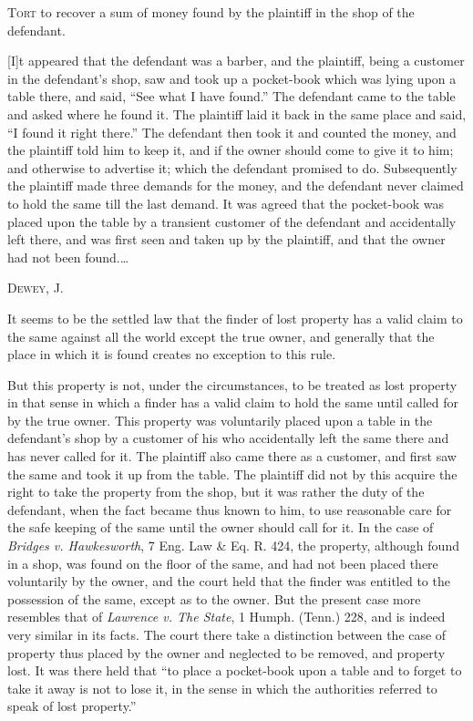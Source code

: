
\textsc{Tort} to recover a sum of money found by the plaintiff in the shop of
the
defendant.

[I]t appeared that the defendant was a barber, and the plaintiff, being a
customer in the defendant's shop, saw and took up a pocket-book which was lying
upon a table there, and said, ``See what I have found.'' The defendant came to
the table and asked where he found it. The plaintiff laid it back in the same
place and said, ``I found it right there.'' The defendant then took it and
counted the money, and the plaintiff told him to keep it, and if the owner
should come to give it to him; and otherwise to advertise it; which the
defendant promised to do. Subsequently the plaintiff made three demands for the
money, and the defendant never claimed to hold the same till the last demand.
It was agreed that the pocket-book was placed upon the table by a transient
customer of the defendant and accidentally left there, and was first seen and
taken up by the plaintiff, and that the owner had not been found.\ldots

\opinion \textsc{Dewey}, J.

It seems to be the settled law that the finder of lost property has a valid
claim to the same against all the world except the true owner, and generally
that the place in which it is found creates no exception to this rule.

But this property is not, under the circumstances, to be treated as lost
property in that sense in which a finder has a valid claim to hold the same
until called for by the true owner. This property was voluntarily placed upon a
table in the defendant's shop by a customer of his who accidentally left the
same there and has never called for it. The plaintiff also came there as a
customer, and first saw the same and took it up from the table. The plaintiff
did not by this acquire the right to take the property from the shop, but it
was rather the duty of the defendant, when the fact became thus known to him,
to use reasonable care for the safe keeping of the same until the owner should
call for it. In the case of \textit{Bridges v. Hawkesworth}, 7 Eng. Law \& Eq.
R. 424, the property, although found in a shop, was found on the floor of the
same, and had not been placed there voluntarily by the owner, and the court
held that the finder was entitled to the possession of the same, except as to
the owner. But the present case more resembles that of \textit{Lawrence v. The
State}, 1 Humph. (Tenn.) 228, and is indeed very similar in its facts. The
court there take a distinction between the case of property thus placed by the
owner and neglected to be removed, and property lost. It was there held that
``to place a pocket-book upon a table and to forget to take it away is not to
lose it, in the sense in which the authorities referred to speak of lost
property.''


